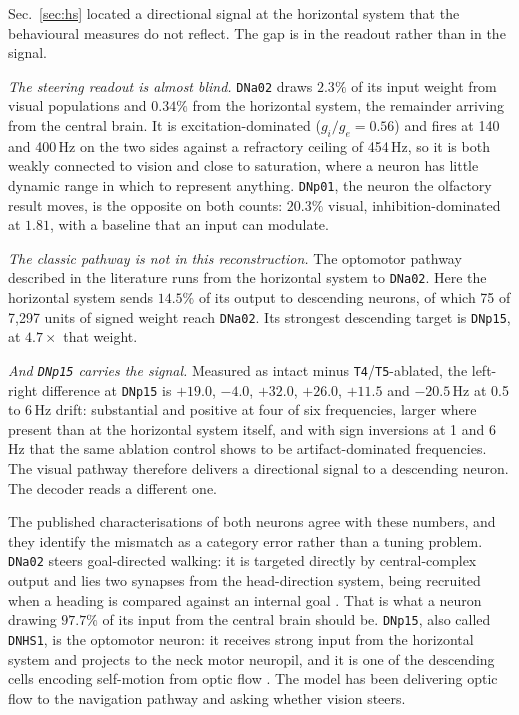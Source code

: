 \documentclass[10pt,twoside]{article}
\newcommand{\cell}[1]{\texttt{#1}}
\begin{document}
Sec.~\ref{sec:hs} located a directional signal at the horizontal system that
the behavioural measures do not reflect. The gap is in the readout rather than
in the signal.

\emph{The steering readout is almost blind.} \cell{DNa02} draws $2.3\%$ of its
input weight from visual populations and $0.34\%$ from the horizontal system,
the remainder arriving from the central brain. It is
excitation-dominated ($g_i/g_e = 0.56$) and fires at 140 and 400\,Hz on the
two sides against a refractory ceiling of 454\,Hz, so it is both weakly
connected to vision and close to saturation, where a neuron has little
dynamic range in which to represent anything. \cell{DNp01}, the neuron the
olfactory result moves, is the opposite on both counts: $20.3\%$ visual,
inhibition-dominated at $1.81$, with a baseline that an input can modulate.

\emph{The classic pathway is not in this reconstruction.} The optomotor
pathway described in the literature runs from the horizontal system to
\cell{DNa02}. Here the horizontal system sends $14.5\%$ of its output to
descending neurons, of which 75 of 7{,}297 units of signed weight reach
\cell{DNa02}. Its strongest descending target is \cell{DNp15}, at $4.7\times$
that weight.

\emph{And \cell{DNp15} carries the signal.} Measured as intact minus
\cell{T4}/\cell{T5}-ablated, the left-right difference at \cell{DNp15} is
$+19.0$, $-4.0$, $+32.0$, $+26.0$, $+11.5$ and $-20.5$\,Hz at 0.5 to 6\,Hz
drift: substantial and positive at four of six frequencies, larger where
present than at the horizontal system itself, and with sign inversions at 1
and 6\,Hz that the same ablation control shows to be artifact-dominated
frequencies. The visual pathway therefore delivers a directional signal to a
descending neuron. The decoder reads a different one.

The published characterisations of both neurons agree with these numbers, and
they identify the mismatch as a category error rather than a tuning problem.
\cell{DNa02} steers goal-directed walking: it is targeted directly by
central-complex output and lies two synapses from the head-direction system,
being recruited when a heading is compared against an internal goal
\citep{rayshubskiy2025}. That is what a neuron drawing $97.7\%$ of its input
from the central brain should be. \cell{DNp15}, also called \cell{DNHS1}, is
the optomotor neuron: it receives strong input from the horizontal system and
projects to the neck motor neuropil, and it is one of the descending cells
encoding self-motion from optic flow
\citep{suver2016,namiki2018}. The model has been delivering optic flow to the
navigation pathway and asking whether vision steers.
\end{document}
